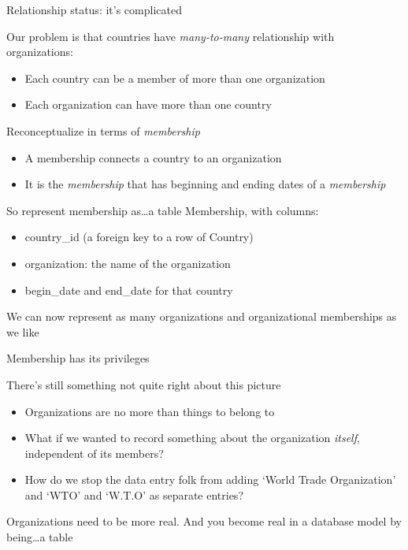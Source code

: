 \documentclass{hertieteaching}
\begin{document}
\begin{frame}{Relationship status: it's complicated}

Our problem is that countries have \textit{many-to-many} relationship with organizations:
\begin{itemize}
  \item Each country can be a member of more than one organization
  \item Each organization can have more than one country
\end{itemize}

Reconceptualize in terms of \textit{membership}
\begin{itemize}
  \item A membership connects a country to an organization
  \item It is the \textit{membership} that has beginning and ending dates of a \textit{membership} 
\end{itemize}
So represent membership as\ldots a table \textsf{Membership}, with columns:
\begin{itemize}
  \item \textsf{country\_id} (a foreign key to a row of \textsf{Country})
  \item \textsf{organization}: the name of the organization
  \item \textsf{begin\_date} and \textsf{end\_date} for that country
\end{itemize}
We can now represent as many organizations and organizational memberships as we like

\end{frame}
\begin{frame}{Membership has its privileges}

There's still something not quite right about this picture
\begin{itemize}
  \item Organizations are no more than things to belong to
  \item What if we wanted to record something about the 
  organization \textit{itself}, independent of its members?
  \item How do we stop the data entry folk from adding `World Trade Organization' and `WTO' and `W.T.O' as separate entries?
\end{itemize}

Organizations need to be more real. And you become real in a database model by being\ldots a table
  
\end{frame}
\end{document}
